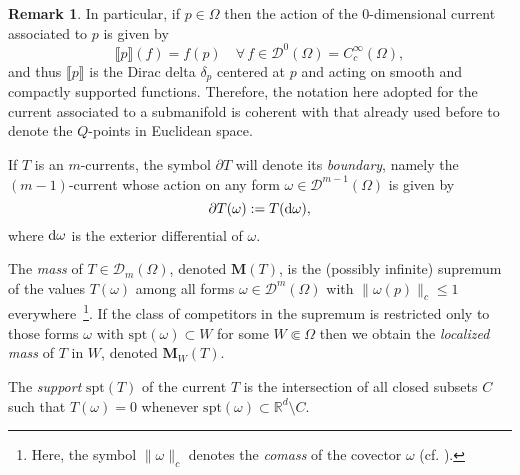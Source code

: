 \documentclass[a4paper,11pt,reqno]{amsart}
\theoremstyle{definition}
\newtheorem{remark}[theorem]{Remark}
\numberwithin{equation}{section}
\numberwithin{subsection}{section}
\newcommand{\R}{\mathbb{R}}
\newcommand{\D}{\mathcal{D}}
\newcommand{\M}{\mathbf{M}}
\newcommand{\spt}{\mathrm{spt}}
\newcommand{\Ha}{\mathcal{H}}
\begin{document}
\begin{remark} \label{rmk:deltas}
In particular, if $p \in \Omega$ then the action of the $0$-dimensional current associated to $p$ is given by
\[
\llbracket p \rrbracket (f) = f(p) \quad \forall \, f \in \D^{0}(\Omega) = C^{\infty}_{c}(\Omega),
\] 
and thus $\llbracket p \rrbracket$ is the Dirac delta $\delta_{p}$ centered at $p$ and acting on smooth and compactly supported functions. Therefore, the notation here adopted for the current associated to a submanifold is coherent with that already used before to denote the $Q$-points in Euclidean space.
\end{remark}

If $T$ is an $m$-currents, the symbol $\partial T$ will denote its \emph{boundary}, namely the $(m-1)$-current whose action on any form $\omega \in \D^{m-1}(\Omega)$ is given by
\[
\partial T(\omega) := T({\rm d}\omega),
\]
where ${\rm d}\omega$ is the exterior differential of $\omega$.


The \emph{mass} of $T \in \D_{m}(\Omega)$, denoted $\M(T)$, is the (possibly infinite) supremum of the values $T(\omega)$ among all forms $\omega \in \D^{m}(\Omega)$ with $\|\omega(p)\|_{c} \leq 1$ everywhere\, \footnote{Here, the symbol $\| \omega \|_{c}$ denotes the \emph{comass} of the covector $\omega$ (cf. \cite[Section 25]{Sim83}).}. If the class of competitors in the supremum is restricted only to those forms $\omega$ with $\spt(\omega) \subset W$ for some $W \Subset \Omega$ then we obtain the \emph{localized mass} of $T$ in $W$, denoted $\M_W(T)$.

%
%
%

The \emph{support} $\spt(T)$ of the current $T$ is the intersection of all closed subsets $C$ such that $T(\omega) = 0$ whenever $\spt(\omega) \subset \R^{d} \setminus C$.
\end{document}
